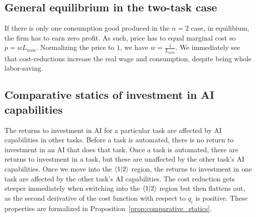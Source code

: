\documentclass{article}
\theoremstyle{plain}
\theoremstyle{plain}
\begin{document}
\subsection{General equilibrium in the two-task case}
If there is only one consumption good produced in the $n=2$ case, in equilibium, the firm has to earn zero profit. 
As such, price has to equal marginal cost so $p = w L_{min}$. 
Normalizing the price to $1$, we have $w = \frac{1}{L_{min}}$.
We immediately see that cost-reductions increase the real wage and consumption, despite being whole labor-saving. 

\subsection{Comparative statics of investment in AI capabilities}
The returns to investment in AI for a particular task are affected by AI capabilities in other tasks.
Before a task is automated, there is no return to investment in an AI that does that task.
Once a task is automated, there are returns to investment in a task, but these are unaffected by the other task's AI capabilities.
Once we move into the $\langle 1|2 \rangle$ region, the returns to investment in one task are affected by the other task's AI capabilities.
The cost reduction gets steeper immediately when switching into the $\langle 1|2 \rangle$ region but then flattens out, as the second derivative of the cost function with respect to $q_i$ is positive.
These properties are formalized in Proposition~\ref{prop:comparative_statics}.
\end{document}
